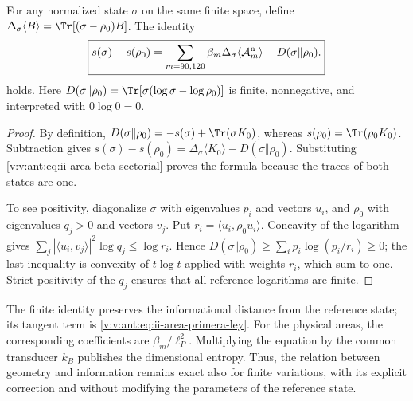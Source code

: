 \begin{theorem}
\label{v:v:ant:thm:ii-area-ley-finita}
For any normalized state \(\sigma\) on the same finite space,
define \(\Delta_\sigma\langle B\rangle
=\Tr[(\sigma-\rho_0)B]\). The identity
\begin{equation}
 \boxed{
 s(\sigma)-s(\rho_0)
 =\sum_{m=90,120}\beta_m
      \Delta_\sigma\langle\mathcal A_m^{\rm n}\rangle
   -D(\sigma\Vert\rho_0).}
 \label{v:v:ant:eq:ii-area-ley-finita}
\end{equation}
holds.
Here \(D(\sigma\Vert\rho_0)=\Tr[\sigma(\log\sigma-\log\rho_0)]\)
is finite, nonnegative, and interpreted with \(0\log0=0\).
\end{theorem}
\begin{proof}
By definition,
\(D(\sigma\Vert\rho_0)=-s(\sigma)+\Tr(\sigma K_0)\), whereas
\(s(\rho_0)=\Tr(\rho_0K_0)\). Subtraction gives
\(s(\sigma)-s(\rho_0)=\Delta_\sigma\langle K_0\rangle
-D(\sigma\Vert\rho_0)\). Substituting
\eqref{v:v:ant:eq:ii-area-beta-sectorial} proves the formula because the
traces of both states are one.

To see positivity, diagonalize \(\sigma\) with eigenvalues
\(p_i\) and vectors \(u_i\), and \(\rho_0\) with eigenvalues
\(q_j>0\) and vectors \(v_j\). Put
\(r_i=\langle u_i,\rho_0u_i\rangle\). Concavity of the logarithm
gives
\(\sum_j|\langle u_i,v_j\rangle|^2\log q_j\le\log r_i\).
Hence
\(D(\sigma\Vert\rho_0)\ge\sum_i p_i\log(p_i/r_i)\ge0\);
the last inequality is convexity of \(t\log t\) applied
with weights \(r_i\), which sum to one. Strict positivity of the
\(q_j\) ensures that all reference logarithms are finite.
\end{proof}

The finite identity preserves the informational distance from the
reference state; its tangent term is
\eqref{v:v:ant:eq:ii-area-primera-ley}. For the physical areas, the
corresponding coefficients are \(\beta_m/\ell_P^2\).
Multiplying the equation by the common transducer \(k_B\) publishes
the dimensional entropy. Thus, the relation between geometry and information
remains exact also for finite variations, with its explicit
correction and without modifying the parameters of the reference state.
